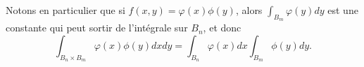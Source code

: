 Notons en particulier que si \( f(x,y)=\varphi(x)\phi(y)\), alors \( \int_{B_m}\varphi(y)dy\) est une constante qui peut sortir de l'intégrale sur \( B_n\), et donc
\begin{equation}		\label{EqFubiniFactori}
	\int_{B_n\times B_m}\varphi(x)\phi(y)dxdy=\int_{B_n}\varphi(x)dx\int_{B_m}\phi(y)dy.
\end{equation}

